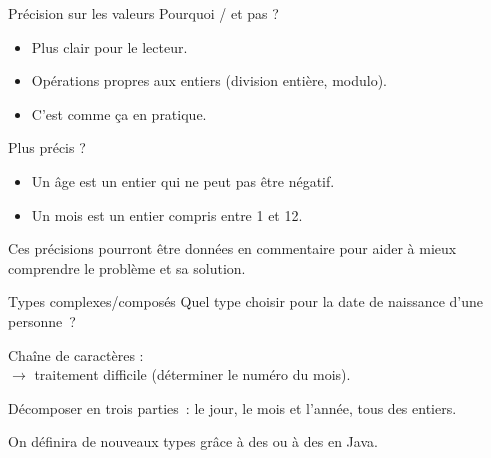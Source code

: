 \begin{frame}{Précision sur les valeurs}
  Pourquoi  /  et pas ?

  \pause
  \begin{itemize}
    \item Plus clair pour le lecteur.
    \item Opérations propres aux entiers (division entière, modulo).
    \item C'est comme ça en pratique.
  \end{itemize}

  \pause
  Plus précis ?
  \begin{itemize}
    \item Un âge est un entier qui ne peut pas être négatif.
    \item Un mois est un entier compris entre 1 et 12.
  \end{itemize}

  Ces précisions pourront être données en commentaire
  pour aider à mieux comprendre le problème et sa solution.
\end{frame}

\begin{frame}{Types complexes/composés}
    Quel type choisir 
    pour la date de naissance d’une personne~?

    \pause
    Chaîne de caractères :  \\
    \pause \(\longrightarrow\) traitement difficile
    (déterminer le numéro du mois).

    \pause
    Décomposer en trois parties~: 
    le jour, le mois et l’année, tous des entiers.

    On définira de nouveaux types grâce à des  ou à des
     en Java.
\end{frame}

